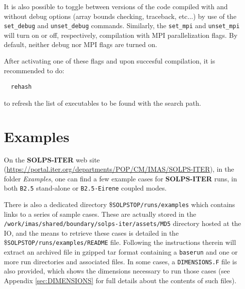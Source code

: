 \documentclass[a4paper,10pt]{report}
\newcommand\SOLPSITER{{\bf SOLPS-ITER} }
\begin{document}
It is also possible to toggle between versions of the code compiled with and without debug options (array bounds checking, traceback, etc...) by use of the {\tt set\_debug} and {\tt unset\_debug} commands. Similarly, the
{\tt set\_mpi} and {\tt unset\_mpi} will turn on or off, respectively, compilation with MPI parallelization flags. By default, neither debug nor MPI flags are turned on.

After activating one of these flags and upon succesful compilation, it is recommended to do:
\begin{verbatim}
  rehash
\end{verbatim}
to refresh the list of executables to be found with the search path.

\section{Examples}
\label{examples}

On the \SOLPSITER web site (\href{https://portal.iter.org/departments/POP/CM/IMAS/SOLPS-ITER}{https://portal.iter.org/departments/POP/CM/IMAS/SOLPS-ITER}), in the folder {\em Examples}, one can find a few example cases for \SOLPSITER runs, in both {\tt B2.5} stand-alone or {\tt B2.5-Eirene} coupled modes.

There is also a dedicated directory \${\tt SOLPSTOP/runs/examples} which contains links to a series of sample cases. These are actually stored in the {\tt /work/imas/shared/boundary/solps-iter/assets/MD5} directory hosted at the IO, and the means to retrieve these cases is detailed in the \${\tt SOLPSTOP/runs/examples/README} file. Following the instructions therein will extract an archived file in gzipped tar format containing a {\tt baserun} and one or more run directories and associated files. In some cases, a {\tt DIMENSIONS.F} file is also provided, which shows the dimensions necessary to run those cases (see Appendix \ref{sec:DIMENSIONS} for full details about the contents of such files).
\end{document}
